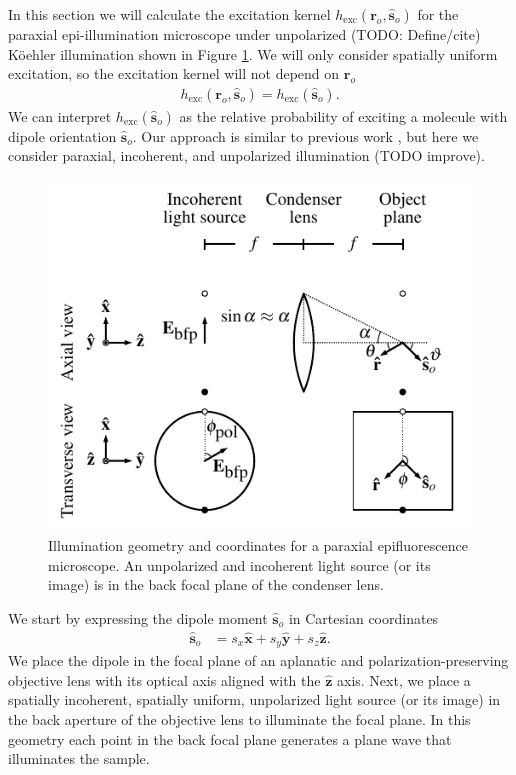 \documentclass[]{osa-article}
\providecommand{\ro}{\mathbf{\mathbf{r}}_o}
\providecommand{\so}{\mathbf{\hat{s}}_o}
\providecommand{\mh}[1]{\mathbf{\hat{#1}}}
\begin{document}
In this section we will calculate the excitation kernel
$h_{\text{exc}}(\ro, \so)$ for the paraxial epi-illumination microscope under
unpolarized (TODO: Define/cite) K\"{o}ehler illumination shown in Figure
\ref{fig:exccoords}. We will only consider spatially uniform excitation, so the
excitation kernel will not depend on $\ro$
\begin{align}
  h_{\text{exc}}(\ro, \so) = h_{\text{exc}}(\so).
\end{align}
We can interpret $h_{\text{exc}}(\so)$ as the relative probability of exciting a
molecule with dipole orientation $\so$. Our approach is similar to previous work
\cite{fourkas2001, chandler2017}, but here we consider paraxial, incoherent, and
unpolarized illumination (TODO improve).

\begin{figure}[h]
 \centering
   \centering
   \includegraphics[scale=.9]{../figures/excitation-coords/excitation-coords.pdf}
   \caption{Illumination geometry and coordinates for a paraxial epifluorescence
     microscope. An unpolarized and incoherent light source (or its image) is in
     the back focal plane of the condenser lens.}
   \label{fig:exccoords}
 \end{figure}

We start by expressing the dipole moment $\so{}$ in Cartesian coordinates
\begin{align}
  \so{} &= s_x\mh{x} + s_y\mh{y} + s_z\mh{z}. \label{eq:spherical}
\end{align}
We place the dipole in the focal plane of an aplanatic and
polarization-preserving objective lens with its optical axis aligned with the
$\mh{z}$ axis. Next, we place a spatially incoherent, spatially uniform,
unpolarized light source (or its image) in the back aperture of the objective
lens to illuminate the focal plane. In this geometry each point in the back
focal plane generates a plane wave that illuminates the sample.
\end{document}
